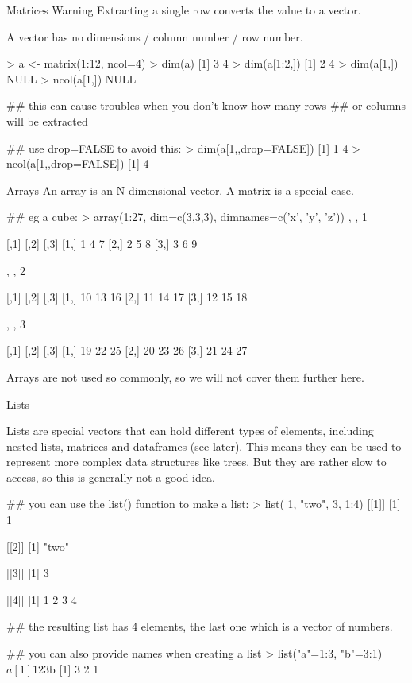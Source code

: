 \documentclass[pdf]{beamer}
\begin{document}
\begin{frame}[fragile]{Matrices Warning}
  Extracting a single row converts the value to a vector.
  
  A vector has no dimensions / column number / row number.
  \begin{rcode}
    > a <- matrix(1:12, ncol=4)
    > dim(a)
    [1] 3 4
    > dim(a[1:2,])
    [1] 2 4
    > dim(a[1,])
    NULL
    > ncol(a[1,])
    NULL
    
    ## this can cause troubles when you don't know how many rows
    ## or columns will be extracted

    ## use drop=FALSE to avoid this:
    > dim(a[1,,drop=FALSE])
    [1] 1 4
    > ncol(a[1,,drop=FALSE])
    [1] 4
  \end{rcode}
\end{frame}


\begin{frame}[fragile]{Arrays}
  An array is an N-dimensional vector. A matrix is
  a special case.

  \begin{rcode}
    ## eg a cube:
    > array(1:27, dim=c(3,3,3), dimnames=c('x', 'y', 'z'))
    , , 1

        [,1] [,2] [,3]
   [1,]    1    4    7
   [2,]    2    5    8
   [3,]    3    6    9

   , , 2

        [,1] [,2] [,3]
   [1,]   10   13   16
   [2,]   11   14   17
   [3,]   12   15   18

   , , 3

         [,1] [,2] [,3]
   [1,]   19   22   25
   [2,]   20   23   26
   [3,]   21   24   27
  \end{rcode}

  Arrays are not used so commonly, so we will not cover them further here.
\end{frame}

\begin{frame}[fragile]{Lists}
  
  {\small
  Lists are special vectors that can hold different types of elements,
  including nested lists, matrices and dataframes (see later). This 
  means they can be used to represent more complex data structures like
  trees. But they are rather slow to access, so this is generally not a good idea.
  }

  \begin{rcode}
    ## you can use the list() function to make a list:
    > list( 1, "two", 3, 1:4)
    [[1]]
    [1] 1
    
    [[2]]
    [1] "two"
    
    [[3]]
    [1] 3
    
    [[4]]
    [1] 1 2 3 4
    
    ## the resulting list has 4 elements, the last one which is a vector of numbers.
    
    ## you can also provide names when creating a list
    > list("a"=1:3, "b"=3:1)
    $a
    [1] 1 2 3
    
    $b
    [1] 3 2 1
  \end{rcode}
\end{frame}
\end{document}
